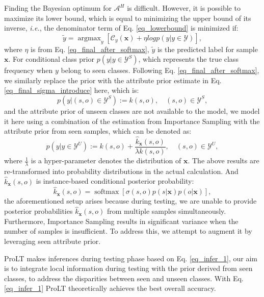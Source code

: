 \documentclass[letterpaper]{article} %
\newcommand{\mx}{\mathbf{x}}
\newcommand{\ie}{\textit{i.e.}}
\theoremstyle{definition}
\begin{document}
Finding the Bayesian optimum for $\mathcal{A}^{H}$ is difficult. However, it is possible to maximize its lower bound, which is equal to minimizing the upper bound of its inverse, \ie, the denominator term of Eq. \ref{eq_lowerbound} is minimized if:
\begin{equation}
		\tilde{y}=\operatorname{argmax}_{y}\left [\mathcal{C}_{y}(\mx)+\eta logp(y|y\in \mathcal{Y})\right ],
        \label{eq_infer_1}
	\end{equation}
where $\eta$ is from Eq. \ref{eq_final_after_softmax}, $\tilde{y}$ is the predicted label for sample $\mx$. For conditional class prior $p(y|y\in \mathcal{Y}^{S})$, which represents the true class frequency when $y$ belong to seen classes. Following Eq. \ref{eq_final_after_softmax}, we similarly replace the prior with the attribute prior estimate in Eq. \ref{eq_final_sigma_introduce} here, which is:
\begin{equation}
p(y | (s,o) \in \mathcal{Y}^{S}) := k(s,o), \quad (s,o) \in \mathcal{Y}^{S},
\label{eq_seen}
\end{equation}
and the attribute prior of unseen classes are not available to the model, we model it here using a combination of the estimation from Importance Sampling \cite{importancesampling} with the attribute prior from seen samples, which can be denoted as:
\begin{equation}
p(y|y\in \mathcal{Y}^{U}):=k(s,o)+\frac{\hat{k}_{\mx}(s,o)}{\lambda k(s,o)}, \quad (s,o) \in \mathcal{Y}^{U},
        \label{eq_importance}
	\end{equation}
where $\frac{1}{\lambda}$ is a hyper-parameter denotes the distribution of $\mx$. The above results are re-transformed into probability distributions in the actual calculation. And $\hat{k}_{\mx}(s,o)$ is instance-based conditional posterior probability:
\begin{equation}
\hat{k}_{\mx}(s,o)=\operatorname{softmax} \left [ \sigma(s,o)p(s|\mx)p(o|\mx)\right ],
        \label{eq_khat}
	\end{equation}
the aforementioned setup arises because during testing, we are unable to provide posterior probabilities $\hat{k}_{\mx}(s,o)$ from multiple samples simultaneously. Furthermore, Importance Sampling results in significant variance when the number of samples is insufficient. To address this, we attempt to augment it by leveraging seen attribute prior.

ProLT makes inferences during testing phase based on Eq. \ref{eq_infer_1}, our aim is to integrate local information during testing with the prior derived from seen classes, to address the disparities between seen and unseen classes. With Eq. \ref{eq_infer_1} ProLT theoretically achieves the best overall accuracy.
\end{document}
